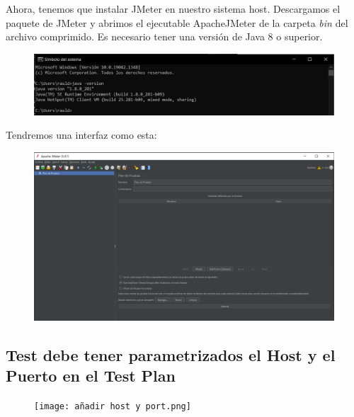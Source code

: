 \documentclass[a4paper]{article}
\begin{document}
\newpage
Ahora, tenemos que instalar JMeter en nuestro sistema host.
Descargamos el paquete de JMeter y abrimos el ejecutable ApacheJMeter de la carpeta \textsl{bin} del 
archivo comprimido. Es necesario tener una versión de Java 8 o superior.
\begin{figure}[hbt!]
    \centering
    \includegraphics[width=\textwidth]{version java.png}
\end{figure}
\newline Tendremos una interfaz como esta:
\begin{figure}[hbt!]
    \centering
    \includegraphics[width=\textwidth]{interfaz apache jmeter.png}
\end{figure}
\newpage
\subsection{Test debe tener parametrizados el Host y el Puerto en el Test Plan}
\begin{figure}[hbt!]
    \centering
    \texttt{[image: añadir host y port.png]}
\end{figure}
\end{document}
